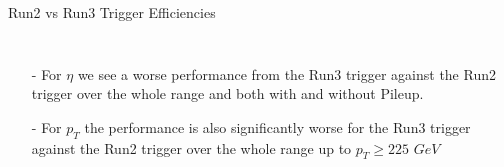\documentclass[aspectratio=1610,8pt]{beamer}					%
\begin{document}
\begin{frame}{Run2 vs Run3 Trigger Efficiencies}
\begin{columns}
        \begin{itemize}
            \item [-]
                For $ \eta$ we see a worse performance from the Run3 trigger against the Run2 trigger over the whole range and both with and without Pileup. 
           \item [-]
                For $p_T$ the performance is also significantly worse for the Run3 trigger against the Run2 trigger over the whole range up to $p_T \ge 225$ $GeV$
        \end{itemize}
    \end{columns}

\end{frame}
\end{document}
